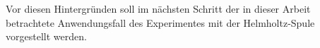 Vor diesen Hintergründen soll im nächsten Schritt der in dieser Arbeit betrachtete Anwendungsfall des Experimentes mit der Helmholtz-Spule vorgestellt werden.

